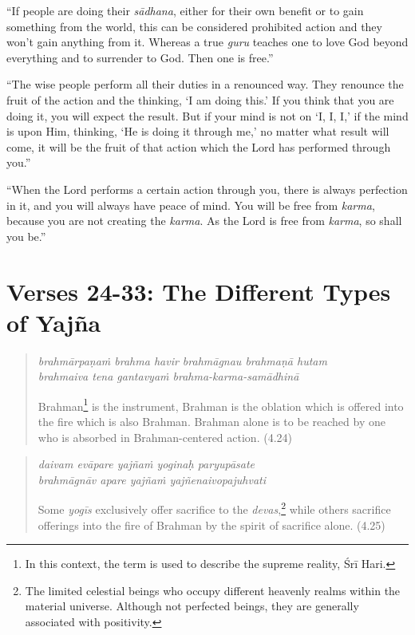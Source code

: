 \documentclass[12pt, twoside, openright]{memoir}
\begin{document}
\enquote{If people are doing their \textit{sādhana}, either for their own benefit or to gain something from the world, this can be considered prohibited action and they won’t gain anything from it. Whereas a true \textit{guru} teaches one to love God beyond everything and to surrender to God. Then one is free.}

\enquote{The wise people perform all their duties in a renounced way. They renounce the fruit of the action and the thinking, \enquote{I am doing this.} If you think that you are doing it, you will expect the result. But if your mind is not on \enquote{I, I, I,} if the mind is upon Him, thinking, \enquote{He is doing it through me,} no matter what result will come, it will be the fruit of that action which the Lord has performed through you.}

\enquote{When the Lord performs a certain action through you, there is always perfection in it, and you will always have peace of mind. You will be free from \textit{karma}, because you are not creating the \textit{karma}. As the Lord is free from \textit{karma}, so shall you be.}

\newpage
\section{Verses 24-33: The Different Types of Yajña}\label{sec-verses-24-33-the-different-types-of-yajna}


\par
\begin{verse}
\textit{brahmārpaṇaṁ brahma havir brahmāgnau brahmaṇā hutam} \\
\textit{brahmaiva tena gantavyaṁ brahma-karma-samādhinā}

\noindent Brahman\footnote{In this context, the term is used to describe the supreme reality, Śrī Hari.} is the instrument, Brahman is the oblation which is offered into the fire which is also Brahman. Brahman alone is to be reached by one who is absorbed in Brahman-centered action. (4.24)
\end{verse}
\par



\par
\begin{verse}
\textit{daivam evāpare yajñaṁ yoginaḥ paryupāsate} \\
\textit{brahmāgnāv apare yajñaṁ yajñenaivopajuhvati}

\noindent Some \textit{yogīs} exclusively offer sacrifice to the \textit{devas},\footnote{The limited celestial beings who occupy different heavenly realms within the material universe. Although not perfected beings, they are generally associated with positivity.} while others sacrifice offerings into the fire of Brahman by the spirit of sacrifice alone. (4.25)
\end{verse}
\par
\end{document}
